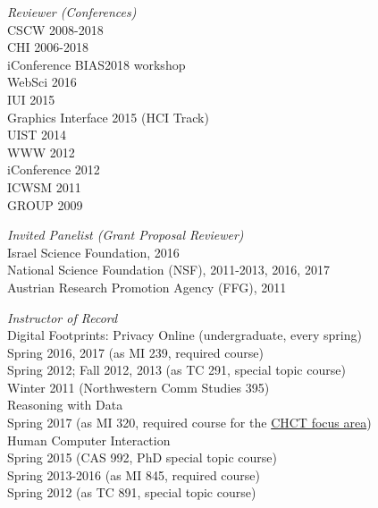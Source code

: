\documentclass[9pt]{extarticle}
\makeatletter
\renewcommand{\section}{%
  \@startsection{section}{1}{0em}{\baselineskip}{3pt}{\large\bfseries\textsc}}
\makeatother
\begin{document}
\emph{Reviewer (Conferences)} \\
CSCW 2008-2018 \\
CHI 2006-2018 \\
iConference BIAS2018 workshop \\
WebSci 2016 \\
IUI 2015 \\
Graphics Interface 2015 (HCI Track) \\
UIST 2014 \\
WWW 2012 \\
iConference 2012 \\
ICWSM 2011 \\
GROUP 2009

\newpage
\emph{Invited Panelist (Grant Proposal Reviewer)} \\
Israel Science Foundation, 2016 \\
National Science Foundation (NSF), 2011-2013, 2016, 2017 \\
Austrian Research Promotion Agency (FFG), 2011


\section{Teaching}

\emph{Instructor of Record} \\
Digital Footprints: Privacy Online (undergraduate, every spring) \\ 
\hspace{0.5cm} Spring 2016, 2017 (as MI 239, required course) \\
\hspace{0.5cm} Spring 2012; Fall 2012, 2013 (as TC 291, special topic course) \\ 
\hspace{0.5cm} Winter 2011 (Northwestern Comm Studies 395) \\

Reasoning with Data \\
\hspace{0.5cm} Spring 2017 (as MI 320, required course for the \href{http://mi.msu.edu/undergraduate-studies/majors/}{CHCT focus area}) \\

Human Computer Interaction \\
\hspace{0.5cm} Spring 2015 (CAS 992, PhD special topic course) \\
\hspace{0.5cm} Spring 2013-2016 (as MI 845, required course) \\
\hspace{0.5cm} Spring 2012 (as TC 891, special topic course) \\
\end{document}
